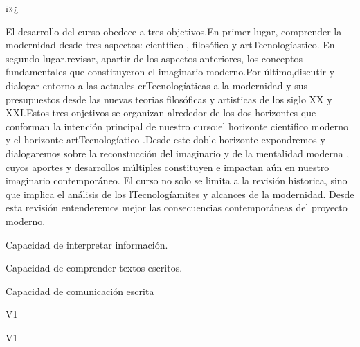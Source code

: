 ï»¿\begin{syllabus}


\begin{justification}
El desarrollo del curso obedece a tres objetivos.En primer lugar, comprender la modernidad desde tres aspectos: científico , filosófico y artTecnologíastico.
En segundo lugar,revisar, apartir de los aspectos anteriores, los conceptos fundamentales que constituyeron el imaginario moderno.Por último,discutir y 
dialogar entorno a las actuales crTecnologíaticas a la modernidad y sus presupuestos desde las nuevas teorias filosóficas y artisticas de los siglo XX y XXI.Estos
tres onjetivos se organizan alrededor de los dos horizontes que conforman la intención principal de nuestro curso:el horizonte cientifico moderno y el horizonte
artTecnologíatico .Desde este doble horizonte expondremos y dialogaremos sobre la reconstucción del imaginario y de la mentalidad moderna , cuyos aportes y desarrollos 
múltiples constituyen e impactan aún en nuestro imaginario contemporáneo. El curso no solo se limita a la revisión historica, sino que implica el análisis de los
lTecnologíamites y alcances de la modernidad. Desde esta revisión entenderemos mejor las consecuencias contemporáneas del proyecto moderno.

\end{justification}

\begin{goals}
\item Capacidad de interpretar información.
\item Capacidad de comprender textos escritos.
\item Capacidad de comunicación escrita
\end{goals}

\begin{outcomes}{V1}
    \item {} %
    \item {} %
    \item {} %
    \item {} %
\end{outcomes}

\begin{competences}{V1}
    \item {}
    \item {}
    \item {}
    \item {}
\end{competences}


\end{syllabus}
